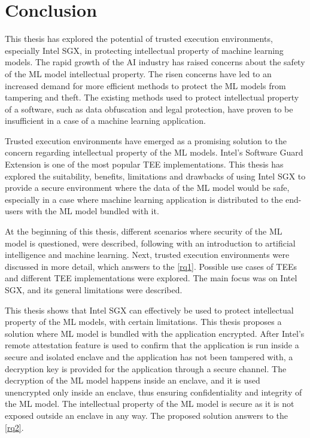 \chapter{Conclusion} \label{conclusion}

This thesis has explored the potential of trusted execution environments, especially Intel SGX, in protecting intellectual property of machine learning models. The rapid growth of the AI industry has raised concerns about the safety of the ML model intellectual property. The risen concerns have led to an increased demand for more efficient methods to protect the ML models from tampering and theft. The existing methods used to protect intellectual property of a software, such as data obfuscation and legal protection, have proven to be insufficient in a case of a machine learning application.

Trusted execution environments have emerged as a promising solution to the concern regarding intellectual property of the ML models. Intel's Software Guard Extension is one of the most popular TEE implementations. This thesis has explored the suitability, benefits, limitations and drawbacks of using Intel SGX to provide a secure environment where the data of the ML model would be safe, especially in a case where machine learning application is distributed to the end-users with the ML model bundled with it.

At the beginning of this thesis, different scenarios where security of the ML model is questioned, were described, following with an introduction to artificial intelligence and machine learning. Next, trusted execution environments were discussed in more detail, which answers to the \ref{rq1}. Possible use cases of TEEs and different TEE implementations were explored. The main focus was on Intel SGX, and its general limitations were described.

This thesis shows that Intel SGX can effectively be used to protect intellectual property of the ML models, with certain limitations. This thesis proposes a solution where ML model is bundled with the application encrypted. After Intel's remote attestation feature is used to confirm that the application is run inside a secure and isolated enclave and the application has not been tampered with, a decryption key is provided for the application through a secure channel. The decryption of the ML model happens inside an enclave, and it is used unencrypted only inside an enclave, thus ensuring confidentiality and integrity of the ML model. The intellectual property of the ML model is secure as it is not exposed outside an enclave in any way. The proposed solution answers to the \ref{rq2}.

